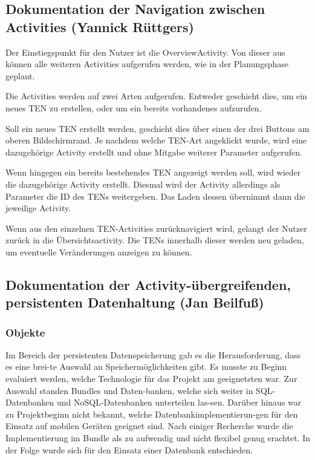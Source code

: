 \newpage
\fancyhead[L]{}
\subsection{Dokumentation der Navigation zwischen Activities (Yannick Rüttgers)}

Der Einstiegspunkt für den Nutzer ist die OverviewActivity. Von dieser aus können alle weiteren Activities aufgerufen werden, wie in der Planungsphase geplant.

Die Activities werden auf zwei Arten aufgerufen. Entweder geschieht dies, um ein neues TEN zu erstellen, oder um ein bereits vorhandenes aufzurufen.

Soll ein neues TEN erstellt werden, geschieht dies über einen der drei Buttons am oberen Bildschirmrand. Je nachdem welche TEN-Art angeklickt wurde, wird eine dazugehörige Activity erstellt und ohne Mitgabe weiterer Parameter aufgerufen.

Wenn hingegen ein bereits bestehendes TEN angezeigt werden soll, wird wieder die dazugehörige Activity erstellt. Diesmal wird der Activity allerdings als Parameter die ID des TENs weitergeben. Das Laden dessen übernimmt dann die jeweilige Activity.

Wenn aus den einzelnen TEN-Activities zurücknavigiert wird, gelangt der Nutzer zurück in die Übersichtsactivity. Die TENs innerhalb dieser werden neu geladen, um eventuelle Veränderungen anzeigen zu können.

\subsection{Dokumentation der Activity-übergreifenden, persistenten Datenhaltung (Jan Beilfuß)}

\subsubsection{Objekte}
Im Bereich der persistenten Datenspeicherung gab es die Herausforderung, dass es eine brei-te Auswahl an Speichermöglichkeiten gibt. Es musste zu Beginn evaluiert werden, welche Technologie für das Projekt am geeignetsten war. Zur Auswahl standen Bundles und Daten-banken, welche sich weiter in SQL-Datenbanken und NoSQL-Datenbanken unterteilen las-sen. Darüber hinaus war zu Projektbeginn nicht bekannt, welche Datenbankimplementierun-gen für den Einsatz auf mobilen Geräten geeignet sind. Nach einiger Recherche wurde die Implementierung im Bundle als zu aufwendig und nicht flexibel genug erachtet. In der Folge wurde sich für den Einsatz einer Datenbank entschieden.

